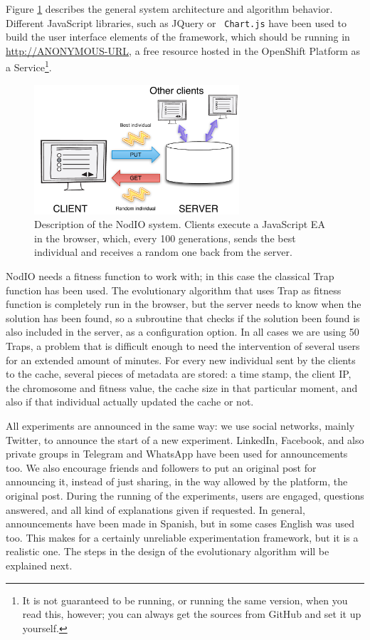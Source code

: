 \documentclass[runningheads,a4paper]{llncs}\usepackage[]{graphicx}\usepackage[]{color}
\begin{document}
Figure \ref{fig:system} describes the general system architecture and
algorithm behavior. Different JavaScript libraries, such as JQuery or {\tt
  Chart.js} have been used to build the user interface elements of the
framework, which should be running in \url{http://ANONYMOUS-URL}, 
a free resource hosted in the
OpenShift Platform as a Service\footnote{It is not guaranteed to be running,
or running the same version, when you read this, however; you can always get
the sources from GitHub and set it up yourself.}.
%
\begin{figure}[!t]
\centering
\includegraphics[width=3in]{system.pdf}
\caption{Description of the NodIO system. Clients execute a JavaScript EA
  in the browser, which, every 100 generations, sends the best
  individual and receives a random one back from the server.}
\label{fig:system}
\end{figure}

NodIO needs a fitness function to work with; in this case the classical Trap 
function \cite{Ackley1987} has been used. 
The evolutionary algorithm that uses Trap as fitness function is
completely run in the
browser, but the server needs to know when the solution has been
found, so a subroutine that checks if the solution been found  
is also included in the server, as a configuration
option. In all cases we are using 50 Traps, a problem
that is difficult enough to need the intervention of several users for
an extended amount of minutes.
For every new individual sent by the clients to the cache, several
pieces of metadata are stored: a time stamp, the client IP, the chromosome and
fitness value, the cache size in that particular moment, and also if that
individual actually updated the cache or not. 

All experiments are announced in the same way: we use social networks,
mainly Twitter, to announce the start of a new experiment. LinkedIn,
Facebook, and also private groups in Telegram and WhatsApp have been
used for announcements too. We also encourage friends and followers to
put an original post for announcing it, instead of just sharing, in
the way allowed by the platform, the original post. During the running
of the experiments, users are engaged, questions answered, and all
kind of explanations given if requested. In general, announcements
have been made in Spanish, but in some cases English was used
too. This makes for a certainly unreliable experimentation framework,
but it is a realistic one. The steps in the design of the evolutionary
algorithm will be explained next.
\end{document}
